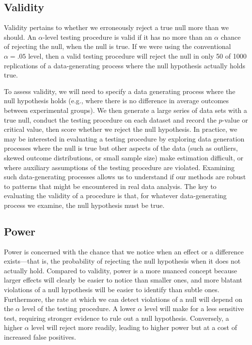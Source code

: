 \documentclass[
]{book}
\begin{document}
\subsection{Validity}\label{validity}

Validity pertains to whether we erroneously reject a true null more than we should.
An \(\alpha\)-level testing procedure is valid if it has no more than an \(\alpha\) chance of rejecting the null, when the null is true.
If we were using the conventional \(\alpha = .05\) level, then a valid testing procedure will reject the null in only 50 of 1000 replications of a data-generating process where the null hypothesis actually holds true.

To assess validity, we will need to specify a data generating process where the null hypothesis holds (e.g., where there is no difference in average outcomes between experimental groups).
We then generate a large series of data sets with a true null, conduct the testing procedure on each dataset and record the \(p\)-value or critical value, then score whether we reject the null hypothesis.
In practice, we may be interested in evaluating a testing procedure by exploring data generation processes where the null is true but other aspects of the data (such as outliers, skewed outcome distributions, or small sample size) make estimation difficult, or where auxiliary assumptions of the testing procedure are violated.
Examining such data-generating processes allows us to understand if our methods are robust to patterns that might be encountered in real data analysis.
The key to evaluating the validity of a procedure is that, for whatever data-generating process we examine, the null hypothesis must be true.

\subsection{Power}\label{power}

Power is concerned with the chance that we notice when an effect or a difference exists---that is, the probability of rejecting the null hypothesis when it does not actually hold.
Compared to validity, power is a more nuanced concept because larger effects will clearly be easier to notice than smaller ones, and more blatant violations of a null hypothesis will be easier to identify than subtle ones.
Furthermore, the rate at which we can detect violations of a null will depend on the \(\alpha\) level of the testing procedure. A lower \(\alpha\) level will make for a less sensitive test, requiring stronger evidence to rule out a null hypothesis.
Conversely, a higher \(\alpha\) level will reject more readily, leading to higher power but at a cost of increased false positives.
\end{document}
